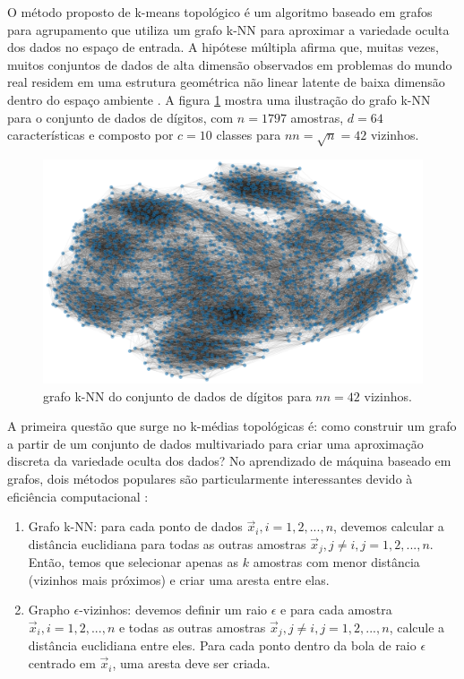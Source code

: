 \documentclass[sn-mathphys,Numbered]{sn-jnl}%
\theoremstyle{thmstyleone}%
\theoremstyle{thmstyletwo}%
\theoremstyle{thmstylethree}%
\begin{document}
 O método proposto de k-means topológico é um algoritmo baseado em grafos para agrupamento que utiliza um grafo k-NN para aproximar a variedade oculta dos dados no espaço de entrada. A hipótese múltipla afirma que, muitas vezes, muitos conjuntos de dados de alta dimensão observados em problemas do mundo real residem em uma estrutura geométrica não linear latente de baixa dimensão dentro do espaço ambiente \cite{Manifold1,Manifold2}. A figura \ref{fig:k-NNG} mostra uma ilustração do grafo k-NN para o conjunto de dados de dígitos, com $n = 1797$ amostras, $d = 64$ características e composto por $c = 10$ classes para $nn = \sqrt{n} = 42$ vizinhos.

\begin{figure}
	\centering
	\includegraphics[scale=0.3]{./k-NNG_Kamada_OK.png}
    \caption{grafo k-NN do conjunto de dados de dígitos para $nn = 42$ vizinhos.}
\label{fig:k-NNG}
\end{figure}

A primeira questão que surge no k-médias topológicas é: como construir um grafo a partir de um conjunto de dados multivariado para criar uma aproximação discreta da variedade oculta dos dados? No aprendizado de máquina baseado em grafos, dois métodos populares são particularmente interessantes devido à eficiência computacional \cite{k-NNG,k-NNG2}:

\begin{enumerate}
	\item Grafo k-NN: para cada ponto de dados $\vec{x}_i, i = 1, 2, ..., n$, devemos calcular a distância euclidiana para todas as outras amostras $\vec{x}_j, j \neq i, j = 1, 2, ..., n$. Então, temos que selecionar apenas as $k$ amostras com menor distância (vizinhos mais próximos) e criar uma aresta entre elas.
	\item Grapho $\epsilon$-vizinhos: devemos definir um raio $\epsilon$ e para cada amostra $\vec{x}_i, i = 1, 2, ..., n$ e todas as outras amostras $\vec{x}_j, j \neq i, j = 1, 2, ..., n$, calcule a distância euclidiana entre eles. Para cada ponto dentro da bola de raio $\epsilon$ centrado em $\vec{x}_i$, uma aresta deve ser criada.
\end{enumerate}
\end{document}
